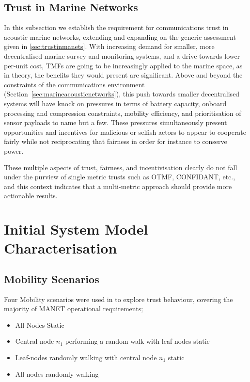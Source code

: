 \documentclass[runningheads,a4paper]{llncs}
\begin{document}
\subsection{Trust in Marine Networks}

In this subsection we establish the requirement for communications trust in acoustic marine networks, extending and expanding on the generic assessment given in \ref{sec:trustinmanets}. 
With increasing demand for smaller, more decentralised marine survey and monitoring systems, and a drive towards lower per-unit cost, TMFs are going to be increasingly applied to the marine space, as in theory, the benefits they would present are significant. 
Above and beyond the constraints of the communications environment (Section~\ref{sec:marineacousticnetworks}), this push towards smaller decentralised systems will have knock on pressures in terms of battery capacity, onboard processing and compression constraints, mobility efficiency, and prioritisation of sensor payloads to name but a few.
These pressures simultaneously present opportunities and incentives for malicious or selfish actors to appear to cooperate fairly while not reciprocating that fairness in order for instance to conserve power.

These multiple aspects of trust, fairness, and incentivisation clearly do not fall under the purview of single metric trusts such as OTMF, CONFIDANT, etc., and this context indicates that a multi-metric approach should provide more actionable results.

\section{Initial System Model Characterisation}\label{sec:initialsystemcharacterisation}

\subsection{Mobility Scenarios}

Four Mobility scenarios were used in \cite{Guo11} to explore trust behaviour, covering the majority of MANET operational requirements; 

\begin{itemize}
  \item All Nodes Static
  \item Central node $n_1$ performing a random walk with leaf-nodes static
  \item Leaf-nodes randomly walking with central node $n_1$ static
  \item All nodes randomly walking
\end{itemize}
\end{document}
